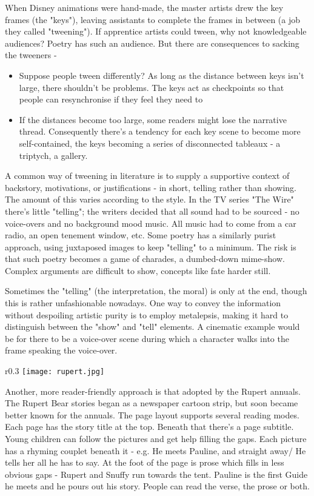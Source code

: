 \documentclass[11pt]{article}
\begin{document}
When Disney animations were hand-made, the master artists drew the key frames (the "keys"), leaving assistants to complete the frames in between (a job they called "tweening"). If apprentice artists could tween, why not knowledgeable audiences? Poetry has such an audience. But there are consequences to sacking the tweeners -
\begin{itemize}
\item    Suppose people tween differently? As long as the distance between keys isn't large, there shouldn't be problems. The keys act as checkpoints so that people can resynchronise if they feel they need to
\item    If the distances become too large, some readers might lose the narrative thread. Consequently there's a tendency for each key scene to become more self-contained, the keys becoming a series of disconnected tableaux - a triptych, a gallery.
\end{itemize}
A common way of tweening in literature is to supply a supportive context of backstory, motivations, or justifications - in short, telling rather than showing. The amount of this varies according to the style. In the TV series "The Wire" there's little "telling"; the writers decided that all sound had to be sourced - no voice-overs and no background mood music. All music had to come from a car radio, an open tenement window, etc. Some poetry has a similarly purist approach, using juxtaposed images to keep "telling" to a minimum. The risk is that such poetry becomes a game of charades, a dumbed-down mime-show. Complex arguments are difficult to show, concepts like fate harder still.

Sometimes the "telling" (the interpretation, the moral) is only at the end, though this is rather unfashionable nowadays. One way to convey the information without despoiling artistic purity is to employ metalepsis, making it hard to distinguish between the "show" and "tell" elements. A cinematic example would be for there to be a voice-over scene during which a character walks into the frame speaking the voice-over.

\begin{wrapfigure}{r}{0.3\textwidth}
\centering
\texttt{[image: rupert.jpg]}
\end{wrapfigure}

Another, more reader-friendly approach is that adopted by the Rupert annuals. The Rupert Bear stories began as a newspaper cartoon strip, but soon became better known for the annuals. The page layout supports several reading modes. Each page has the story title at the top. Beneath that there's a page subtitle. Young children can follow the pictures and get help filling the gaps. Each picture has a rhyming couplet beneath it - e.g. He meets Pauline, and straight away/ He tells her all he has to say. At the foot of the page is prose which fills in less obvious gaps - Rupert and Snuffy run towards the tent. Pauline is the first Guide he meets and he pours out his story. People can read the verse, the prose or both.
\end{document}
